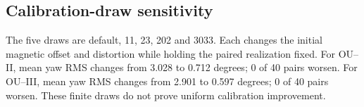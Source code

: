 \subsection{Calibration-draw sensitivity}
The five draws are default, 11, 23, 202 and 3033. Each changes the initial
magnetic offset and distortion while holding the paired realization fixed.
For OU--II, mean yaw RMS changes from 3.028 to 0.712 degrees; 0 of 40 pairs worsen.
For OU--III, mean yaw RMS changes from 2.901 to 0.597 degrees; 0 of 40 pairs worsen.
These finite draws do not prove uniform calibration improvement.
